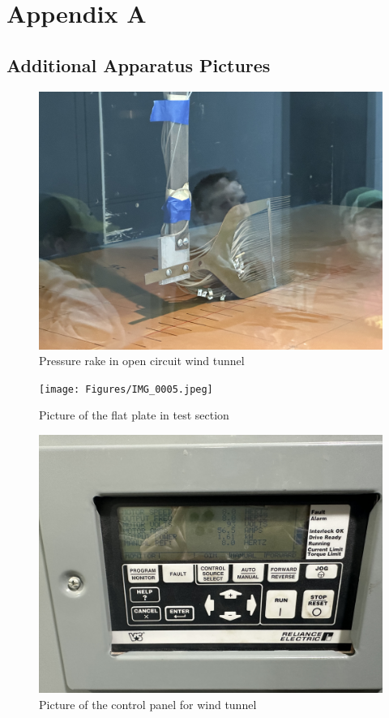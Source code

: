 \chapter{Appendix A}

\section{Additional Apparatus Pictures} \label{sec:additional_apparatus}

\begin{figure}[htpb]
    \centering
    \includegraphics[width=0.75\linewidth]{Figures/IMG_0002.jpeg}
    \caption[Pressure Rake in open circuit wind tunnel]{Pressure rake in open circuit wind tunnel}
    \label{fig: PressureRake}
\end{figure}

\begin{figure}[htpb]
    \centering
    \texttt{[image: Figures/IMG\_0005.jpeg]}
    \caption[Picture of the flat plate in test section]{Picture of the flat plate in test section}
    \label{fig: FlatPlate}
\end{figure}

\begin{figure}[htpb]
    \centering
    \includegraphics[width=0.75\linewidth]{Figures/IMG_0007.jpeg}
    \caption[Picture of the control panel for wind tunnel]{Picture of the control panel for wind tunnel}
    \label{fig: WindTunnelControl }
\end{figure}


